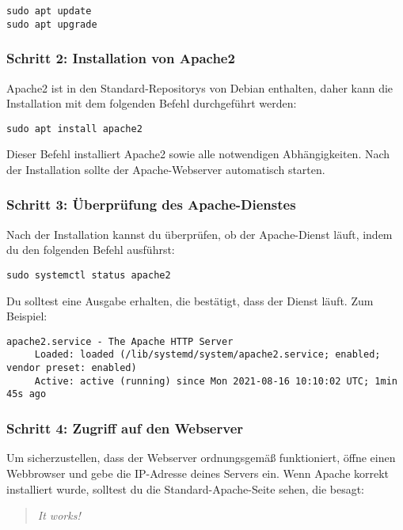\documentclass[a4paper,12pt]{article}
\begin{document}
\begin{lstlisting}
sudo apt update
sudo apt upgrade
\end{lstlisting}

\subsubsection{Schritt 2: Installation von Apache2}
Apache2 ist in den Standard-Repositorys von Debian enthalten, daher kann die Installation mit dem folgenden Befehl durchgeführt werden:

\begin{lstlisting}
sudo apt install apache2
\end{lstlisting}

Dieser Befehl installiert Apache2 sowie alle notwendigen Abhängigkeiten. Nach der Installation sollte der Apache-Webserver automatisch starten.

\subsubsection{Schritt 3: Überprüfung des Apache-Dienstes}
Nach der Installation kannst du überprüfen, ob der Apache-Dienst läuft, indem du den folgenden Befehl ausführst:

\begin{lstlisting}
sudo systemctl status apache2
\end{lstlisting}

Du solltest eine Ausgabe erhalten, die bestätigt, dass der Dienst läuft. Zum Beispiel:

\begin{lstlisting}
apache2.service - The Apache HTTP Server
     Loaded: loaded (/lib/systemd/system/apache2.service; enabled; vendor preset: enabled)
     Active: active (running) since Mon 2021-08-16 10:10:02 UTC; 1min 45s ago
\end{lstlisting}

\subsubsection{Schritt 4: Zugriff auf den Webserver}
Um sicherzustellen, dass der Webserver ordnungsgemäß funktioniert, öffne einen Webbrowser und gebe die IP-Adresse deines Servers ein. Wenn Apache korrekt installiert wurde, solltest du die Standard-Apache-Seite sehen, die besagt:

\begin{quote}
    \textit{It works!}
\end{quote}
\end{document}
